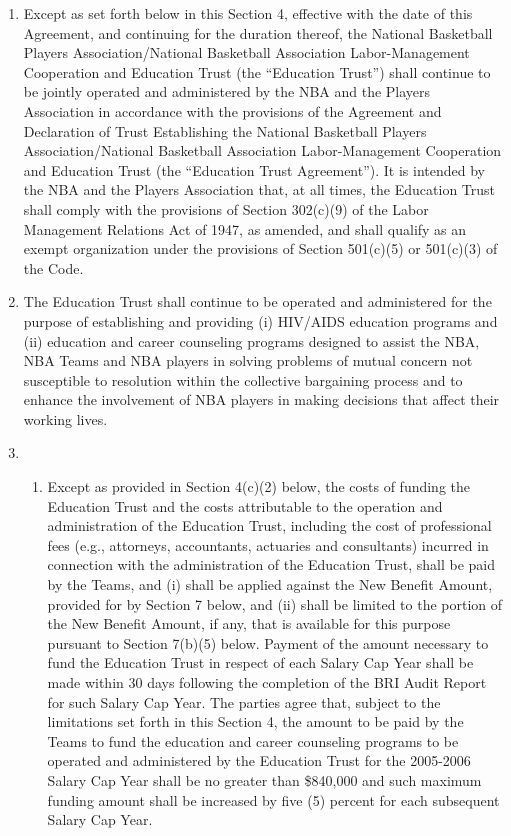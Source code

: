 \documentclass[
]{book}
\providecommand{\tightlist}{%
  \setlength{\itemsep}{0pt}\setlength{\parskip}{0pt}}
\begin{document}
\begin{enumerate}
\def\labelenumi{(\alph{enumi})}
\item
  Except as set forth below in this Section 4, effective with the date of this Agreement, and continuing for the duration thereof, the National Basketball Players Association/National Basketball Association Labor-Management Cooperation and Education Trust (the ``Education Trust'') shall continue to be jointly operated and administered by the NBA and the Players Association in accordance with the provisions of the Agreement and Declaration of Trust Establishing the National Basketball Players Association/National Basketball Association Labor-Management Cooperation and Education Trust (the ``Education Trust Agreement''). It is intended by the NBA and the Players Association that, at all times, the Education Trust shall comply with the provisions of Section 302(c)(9) of the Labor Management Relations Act of 1947, as amended, and shall qualify as an exempt organization under the provisions of Section 501(c)(5) or 501(c)(3) of the Code.
\item
  The Education Trust shall continue to be operated and administered for the purpose of establishing and providing (i) HIV/AIDS education programs and (ii) education and career counseling programs designed to assist the NBA, NBA Teams and NBA players in solving problems of mutual concern not susceptible to resolution within the collective bargaining process and to enhance the involvement of NBA players in making decisions that affect their working lives.
\item
  \begin{enumerate}
  \def\labelenumii{(\arabic{enumii})}
  \tightlist
  \item
    Except as provided in Section 4(c)(2) below, the costs of funding the Education Trust and the costs attributable to the operation and administration of the Education Trust, including the cost of professional fees (e.g., attorneys, accountants, actuaries and consultants) incurred in connection with the administration of the Education Trust, shall be paid by the Teams, and (i) shall be applied against the New Benefit Amount, provided for by Section 7 below, and (ii) shall be limited to the portion of the New Benefit Amount, if any, that is available for this purpose pursuant to Section 7(b)(5) below. Payment of the amount necessary to fund the Education Trust in respect of each Salary Cap Year shall be made within 30 days following the completion of the BRI Audit Report for such Salary Cap Year. The parties agree that, subject to the limitations set forth in this Section 4, the amount to be paid by the Teams to fund the education and career counseling programs to be operated and administered by the Education Trust for the 2005-2006 Salary Cap Year shall be no greater than \$840,000 and such maximum funding amount shall be increased by five (5) percent for each subsequent Salary Cap Year.

\end{enumerate}
\end{enumerate}
\end{document}
